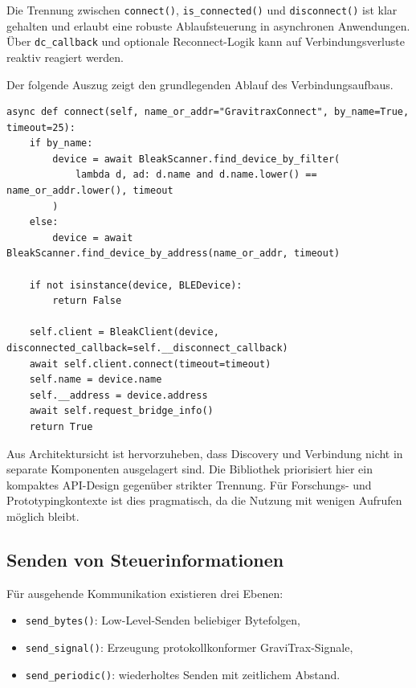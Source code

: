 Die Trennung zwischen \texttt{connect()}, \texttt{is\_connected()} und \texttt{disconnect()} ist klar gehalten und erlaubt eine robuste Ablaufsteuerung in asynchronen Anwendungen.
Über \texttt{dc\_callback} und optionale Reconnect-Logik kann auf Verbindungsverluste reaktiv reagiert werden.

Der folgende Auszug zeigt den grundlegenden Ablauf des Verbindungsaufbaus.

\begin{listing}[ht]
\caption{Auszug: Verbindungsaufbau per Name oder Adresse}
\label{lst:connect-flow}
\begin{verbatim}
async def connect(self, name_or_addr="GravitraxConnect", by_name=True, timeout=25):
	if by_name:
		device = await BleakScanner.find_device_by_filter(
			lambda d, ad: d.name and d.name.lower() == name_or_addr.lower(), timeout
		)
	else:
		device = await BleakScanner.find_device_by_address(name_or_addr, timeout)

	if not isinstance(device, BLEDevice):
		return False

	self.client = BleakClient(device, disconnected_callback=self.__disconnect_callback)
	await self.client.connect(timeout=timeout)
	self.name = device.name
	self.__address = device.address
	await self.request_bridge_info()
	return True
\end{verbatim}
\end{listing}

Aus Architektursicht ist hervorzuheben, dass Discovery und Verbindung nicht in separate Komponenten ausgelagert sind.
Die Bibliothek priorisiert hier ein kompaktes API-Design gegenüber strikter Trennung.
Für Forschungs- und Prototypingkontexte ist dies pragmatisch, da die Nutzung mit wenigen Aufrufen möglich bleibt.

\subsection{Senden von Steuerinformationen}
Für ausgehende Kommunikation existieren drei Ebenen:
\begin{itemize}
	\item \texttt{send\_bytes()}: Low-Level-Senden beliebiger Bytefolgen,
	\item \texttt{send\_signal()}: Erzeugung protokollkonformer GraviTrax-Signale,
	\item \texttt{send\_periodic()}: wiederholtes Senden mit zeitlichem Abstand.
\end{itemize}

